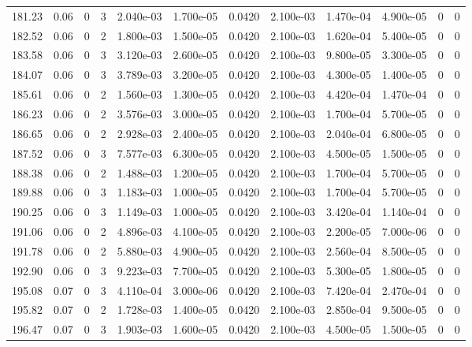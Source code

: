 \documentclass[preview]{standalone}
\begin{document}
{{{{{{\begin{tabular}{L{1.2cm}C{1.2cm} C{0.3cm}C{0.5cm} C{1.4cm}C{1.4cm} C{1.4cm}C{1.4cm} C{1.6cm}C{1.6cm} C{1.6cm}C{1.6cm}}
  181.23  &  0.06  & 0     &  3 &  2.040e-03  & 1.700e-05  &  0.0420&   2.100e-03& 1.470e-04 & 4.900e-05   &  0 & 0  \\ 
  182.52  &  0.06  & 0     &  2 &  1.800e-03  & 1.500e-05  &  0.0420&   2.100e-03& 1.620e-04 & 5.400e-05   &  0 & 0  \\ 
  183.58  &  0.06  & 0     &  3 &  3.120e-03  & 2.600e-05  &  0.0420&   2.100e-03& 9.800e-05 & 3.300e-05   &  0 & 0  \\ 
  184.07  &  0.06  & 0     &  3 &  3.789e-03  & 3.200e-05  &  0.0420&   2.100e-03& 4.300e-05 & 1.400e-05   &  0 & 0  \\ 
  185.61  &  0.06  & 0     &  2 &  1.560e-03  & 1.300e-05  &  0.0420&   2.100e-03& 4.420e-04 & 1.470e-04   &  0 & 0  \\ 
  186.23  &  0.06  & 0     &  2 &  3.576e-03  & 3.000e-05  &  0.0420&   2.100e-03& 1.700e-04 & 5.700e-05   &  0 & 0  \\ 
  186.65  &  0.06  & 0     &  2 &  2.928e-03  & 2.400e-05  &  0.0420&   2.100e-03& 2.040e-04 & 6.800e-05   &  0 & 0  \\ 
  187.52  &  0.06  & 0     &  3 &  7.577e-03  & 6.300e-05  &  0.0420&   2.100e-03& 4.500e-05 & 1.500e-05   &  0 & 0  \\ 
  188.38  &  0.06  & 0     &  2 &  1.488e-03  & 1.200e-05  &  0.0420&   2.100e-03& 1.700e-04 & 5.700e-05   &  0 & 0  \\ 
  189.88  &  0.06  & 0     &  3 &  1.183e-03  & 1.000e-05  &  0.0420&   2.100e-03& 1.700e-04 & 5.700e-05   &  0 & 0  \\ 
  190.25  &  0.06  & 0     &  3 &  1.149e-03  & 1.000e-05  &  0.0420&   2.100e-03& 3.420e-04 & 1.140e-04   &  0 & 0  \\ 
  191.06  &  0.06  & 0     &  2 &  4.896e-03  & 4.100e-05  &  0.0420&   2.100e-03& 2.200e-05 & 7.000e-06   &  0 & 0  \\ 
  191.78  &  0.06  & 0     &  2 &  5.880e-03  & 4.900e-05  &  0.0420&   2.100e-03& 2.560e-04 & 8.500e-05   &  0 & 0  \\ 
  192.90  &  0.06  & 0     &  3 &  9.223e-03  & 7.700e-05  &  0.0420&   2.100e-03& 5.300e-05 & 1.800e-05   &  0 & 0  \\ 
  195.08  &  0.07  & 0     &  3 &  4.110e-04  & 3.000e-06  &  0.0420&   2.100e-03& 7.420e-04 & 2.470e-04   &  0 & 0  \\ 
  195.82  &  0.07  & 0     &  2 &  1.728e-03  & 1.400e-05  &  0.0420&   2.100e-03& 2.850e-04 & 9.500e-05   &  0 & 0  \\ 
  196.47  &  0.07  & 0     &  3 &  1.903e-03  & 1.600e-05  &  0.0420&   2.100e-03& 4.500e-05 & 1.500e-05   &  0 & 0  \\ 

\end{tabular}}}}}}}
\end{document}
